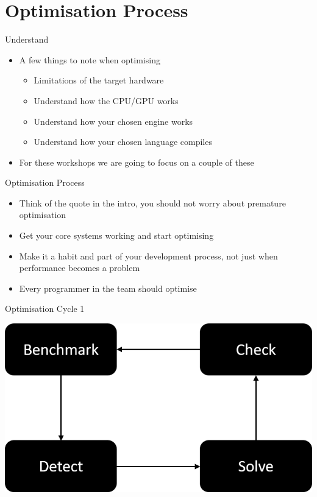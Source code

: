 \part{Optimisation Process}
\frame{\partpage}

\begin{frame}{Understand}
	\begin{itemize}
		\item A few things to note when optimising
		\begin{itemize}
			\item Limitations of the target hardware
			\item Understand how the CPU/GPU works
			\item Understand how your chosen engine works
			\item Understand how your chosen language compiles
		\end{itemize}
		\item For these workshops we are going to focus on a couple of these
	\end{itemize}
\end{frame}

\begin{frame}{Optimisation Process}
	\begin{itemize}
		\item Think of the quote in the intro, you should not worry about premature optimisation
		\item Get your core systems working and start optimising
		\item Make it a habit and part of your development process, not just when performance becomes a problem
		\item Every programmer in the team should optimise
	\end{itemize}
\end{frame}

\begin{frame}{Optimisation Cycle 1}
	\begin{center}
		\includegraphics[width=\textwidth,height=\textheight,keepaspectratio]{optimisation_cycle}
	\end{center}
\end{frame}

